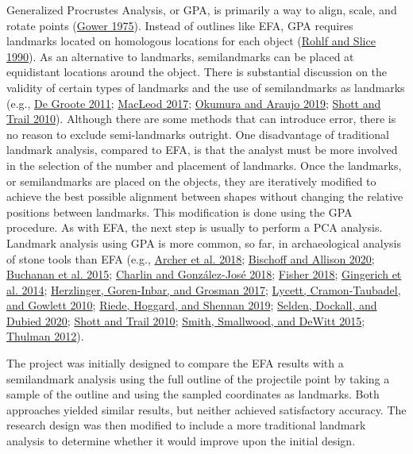 \documentclass{article}
\begin{document}
Generalized Procrustes Analysis, or GPA, is primarily a way to align,
scale, and rotate points (\protect\hyperlink{ref-Gower1975-uv}{Gower
1975}). Instead of outlines like EFA, GPA requires landmarks located on
homologous locations for each object
(\protect\hyperlink{ref-Rohlf1990-mp}{Rohlf and Slice 1990}). As an
alternative to landmarks, semilandmarks can be placed at equidistant
locations around the object. There is substantial discussion on the
validity of certain types of landmarks and the use of semilandmarks as
landmarks (e.g., \protect\hyperlink{ref-De_Groote2011-mh}{De Groote
2011}; \protect\hyperlink{ref-MacLeod2017-yl}{MacLeod 2017};
\protect\hyperlink{ref-Okumura2019-ur}{Okumura and Araujo 2019};
\protect\hyperlink{ref-Shott2010-fn}{Shott and Trail 2010}). Although
there are some methods that can introduce error, there is no reason to
exclude semi-landmarks outright. One disadvantage of traditional
landmark analysis, compared to EFA, is that the analyst must be more
involved in the selection of the number and placement of landmarks. Once
the landmarks, or semilandmarks are placed on the objects, they are
iteratively modified to achieve the best possible alignment between
shapes without changing the relative positions between landmarks. This
modification is done using the GPA procedure. As with EFA, the next step
is usually to perform a PCA analysis. Landmark analysis using GPA is
more common, so far, in archaeological analysis of stone tools than EFA
(e.g., \protect\hyperlink{ref-Archer2018-zi}{Archer et al. 2018};
\protect\hyperlink{ref-Bischoff2020-zn}{Bischoff and Allison 2020};
\protect\hyperlink{ref-Buchanan2015-dx}{Buchanan et al. 2015};
\protect\hyperlink{ref-Charlin2018-yg}{Charlin and González-José 2018};
\protect\hyperlink{ref-Fisher2018-jq}{Fisher 2018};
\protect\hyperlink{ref-Gingerich2014-cb}{Gingerich et al. 2014};
\protect\hyperlink{ref-Herzlinger2017-ce}{Herzlinger, Goren-Inbar, and
Grosman 2017}; \protect\hyperlink{ref-Lycett2010-od}{Lycett,
Cramon-Taubadel, and Gowlett 2010};
\protect\hyperlink{ref-Riede2019-gb}{Riede, Hoggard, and Shennan 2019};
\protect\hyperlink{ref-Selden2020-ni}{Selden, Dockall, and Dubied 2020};
\protect\hyperlink{ref-Shott2010-fn}{Shott and Trail 2010};
\protect\hyperlink{ref-Smith2015-qk}{Smith, Smallwood, and DeWitt 2015};
\protect\hyperlink{ref-Thulman2012-fo}{Thulman 2012}).

The project was initially designed to compare the EFA results with a
semilandmark analysis using the full outline of the projectile point by
taking a sample of the outline and using the sampled coordinates as
landmarks. Both approaches yielded similar results, but neither achieved
satisfactory accuracy. The research design was then modified to include
a more traditional landmark analysis to determine whether it would
improve upon the initial design.
\end{document}

